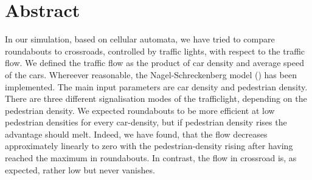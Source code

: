 \section{Abstract}
In our simulation, based on cellular automata, we have tried to compare roundabouts to crossroads, controlled by traffic lights, with respect to the traffic flow. We defined the traffic flow as the product of car density and average speed of the cars. Whereever reasonable, the Nagel-Schreckenberg model (\cite{schreckenberg}) has been implemented. The main input parameters are car density and pedestrian density. There are three different signalisation modes of the trafficlight, depending on the pedestrian density. We expected roundabouts to be more efficient at low pedestrian densities for every car-density, but if pedestrian density rises the advantage should melt. Indeed, we have found, that the flow decreases approximately linearly to zero with the pedestrian-density rising after having reached the maximum in roundabouts. In contrast, the flow in crossroad is, as expected, rather low but never vanishes. 